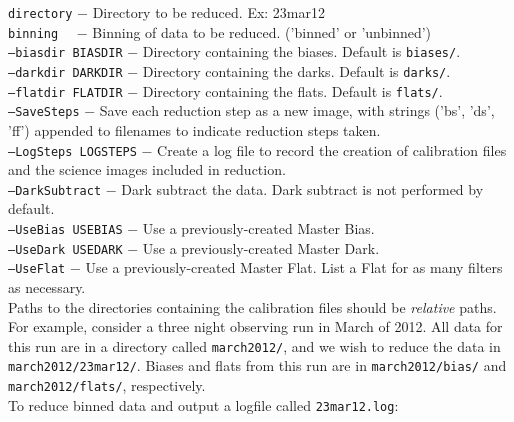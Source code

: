 \documentclass{article}
\begin{document}
\texttt{directory} $-$ Directory to be reduced. Ex: 23mar12\\

\texttt{binning}~~ $-$ Binning of data to be reduced. ('binned' or 
    'unbinned')\\

\texttt{--biasdir BIASDIR} $-$ Directory containing the biases. 
    Default is \texttt{biases/}.\\

\texttt{--darkdir DARKDIR} $-$ Directory containing the darks. 
    Default is \texttt{darks/}.\\

\texttt{--flatdir FLATDIR} $-$ Directory containing the flats. 
    Default is \texttt{flats/}. \\

\texttt{--SaveSteps} $-$ \hangindent=3.1cm Save each reduction step as a
     new image, with strings ('bs', 'ds', 'ff') appended to  
     filenames to indicate reduction steps taken. \\

\texttt{--LogSteps LOGSTEPS} $-$ \hangindent=4.6cm Create a log file to 
    record the creation of calibration files and the science images 
    included in reduction. \\

\texttt{--DarkSubtract} $-$ Dark subtract the data. Dark subtract is not
    performed by default.\\

\texttt{--UseBias USEBIAS} $-$ Use a previously-created Master Bias. \\

\texttt{--UseDark USEDARK} $-$ Use a previously-created Master Dark. \\

\texttt{--UseFlat} $-$ Use a previously-created Master Flat. List a 
                       Flat for as many filters as necessary. \\

\noindent Paths to the directories containing the calibration files
should be \textit{relative} paths.
For example, consider a three night observing run in March of 2012. 
All data for this run are in a directory called \texttt{march2012/},
and we wish to reduce the data in \texttt{march2012/23mar12/}.
Biases and flats from this run are in \texttt{march2012/bias/}
and \texttt{march2012/flats/}, respectively.\\

\noindent To reduce binned data and output a logfile called 
\texttt{23mar12.log}:
\end{document}
